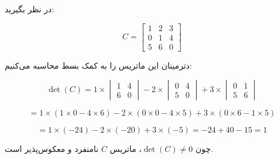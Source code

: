 \begin{example}
	در نظر بگیرید:
	
	\[
	C = \begin{bmatrix} 1 & 2 & 3 \\ 0 & 1 & 4 \\ 5 & 6 & 0 \end{bmatrix}
	\]
	
	دترمینان این ماتریس را به کمک بسط محاسبه می‌کنیم:
	
	\[
	\det(C) = 1 \times \begin{vmatrix} 1 & 4 \\ 6 & 0 \end{vmatrix}
	- 2 \times \begin{vmatrix} 0 & 4 \\ 5 & 0 \end{vmatrix}
	+ 3 \times \begin{vmatrix} 0 & 1 \\ 5 & 6 \end{vmatrix}
	\]
	
	\[
	= 1 \times (1 \times 0 - 4 \times 6)
	- 2 \times (0 \times 0 - 4 \times 5)
	+ 3 \times (0 \times 6 - 1 \times 5)
	\]
	
	\[
	= 1 \times (-24) - 2 \times (-20) + 3 \times (-5) = -24 + 40 - 15 = 1
	\]
	
	چون $\det(C) \neq 0$، ماتریس $C$ نامنفرد و معکوس‌پذیر است.
\end{example}
